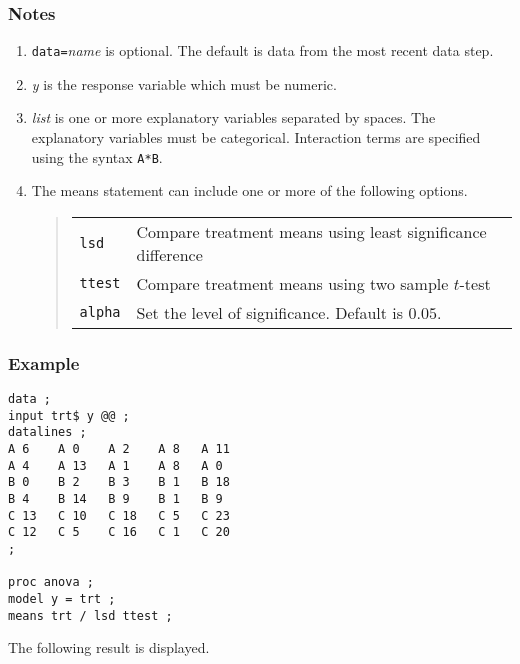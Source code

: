 \documentclass[12pt]{article}
\begin{document}
\subsubsection*{Notes}

\begin{enumerate}
\item
{\tt data=}{\it name} is optional.
The default is data from the most recent data step.
\item
{\it y} is the response variable which must be numeric.
\item
{\it list} is one or more explanatory variables separated by spaces.
The explanatory variables must be categorical.
Interaction terms are specified using the syntax {\tt A*B}.
\item
The means statement can include one or more of the following options.
\begin{quote}
\begin{tabular}{ll}
{\tt lsd} & Compare treatment means using least significance difference \\
{\tt ttest} & Compare treatment means using two sample $t$-test \\
{\tt alpha} & Set the level of significance. Default is $0.05$.
\end{tabular}
\end{quote}
\end{enumerate}

\subsubsection*{Example}

{\footnotesize\begin{verbatim}
data ;
input trt$ y @@ ;
datalines ;
A 6    A 0    A 2    A 8   A 11
A 4    A 13   A 1    A 8   A 0
B 0    B 2    B 3    B 1   B 18
B 4    B 14   B 9    B 1   B 9
C 13   C 10   C 18   C 5   C 23
C 12   C 5    C 16   C 1   C 20
;

proc anova ;
model y = trt ;
means trt / lsd ttest ;
\end{verbatim}}

The following result is displayed.
\end{document}
